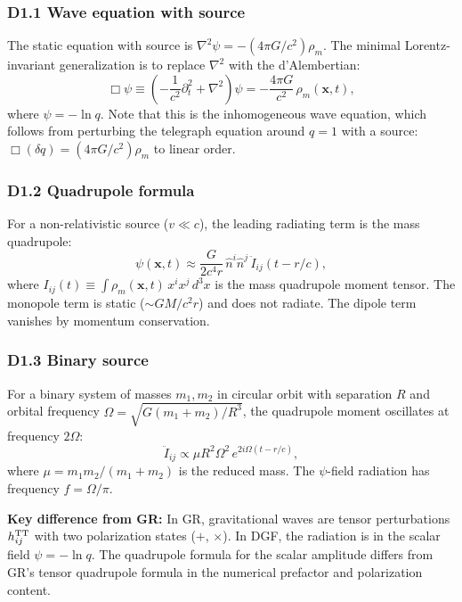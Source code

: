 \documentclass[reprint]{revtex4-2}
\begin{document}
\subsubsection{D1.1 Wave equation with source}

The static equation with source is $\nabla^2\psi = -(4\pi G/c^2)\rho_m$. The minimal Lorentz-invariant generalization is to replace $\nabla^2$ with the d'Alembertian:
\begin{equation}
\Box\psi \equiv \left(-\frac{1}{c^2}\partial_t^2 + \nabla^2\right)\psi = -\frac{4\pi G}{c^2}\,\rho_m(\mathbf{x},t),
\label{eq:scalar_wave}
\end{equation}
where $\psi = -\ln q$. Note that this is the inhomogeneous wave equation, which follows from perturbing the telegraph equation around $q=1$ with a source: $\Box(\delta q) = (4\pi G/c^2)\rho_m$ to linear order.

\subsubsection{D1.2 Quadrupole formula}

For a non-relativistic source ($v \ll c$), the leading radiating term is the mass quadrupole:
\begin{equation}
\boxed{\psi(\mathbf{x},t) \approx \frac{G}{2c^4 r}\,\hat{n}^i\hat{n}^j\,\ddot{I}_{ij}(t - r/c)},
\label{eq:quadrupole}
\end{equation}
where $I_{ij}(t) \equiv \int \rho_m(\mathbf{x},t)\,x^i x^j\,d^3x$ is the mass quadrupole moment tensor. The monopole term is static ($\sim GM/c^2 r$) and does not radiate. The dipole term vanishes by momentum conservation.

\subsubsection{D1.3 Binary source}

For a binary system of masses $m_1, m_2$ in circular orbit with separation $R$ and orbital frequency $\Omega = \sqrt{G(m_1+m_2)/R^3}$, the quadrupole moment oscillates at frequency $2\Omega$:
\begin{equation}
\ddot{I}_{ij} \propto \mu R^2\Omega^2\,e^{2i\Omega(t - r/c)},
\end{equation}
where $\mu = m_1 m_2/(m_1+m_2)$ is the reduced mass. The $\psi$-field radiation has frequency $f = \Omega/\pi$.

\textbf{Key difference from GR:} In GR, gravitational waves are tensor perturbations $h_{ij}^{\rm TT}$ with two polarization states ($+$, $\times$). In DGF, the radiation is in the scalar field $\psi = -\ln q$. The quadrupole formula for the scalar amplitude differs from GR's tensor quadrupole formula in the numerical prefactor and polarization content.
\end{document}
